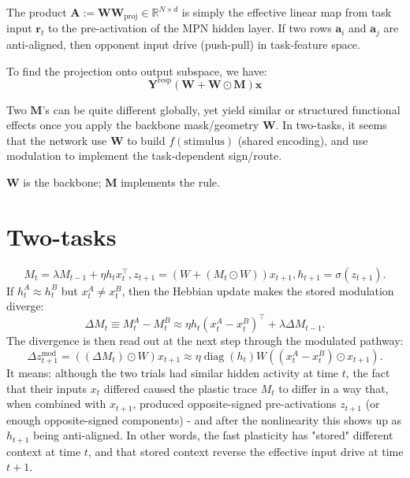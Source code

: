 \documentclass{article}
\begin{document}
The product $\mathbf{A}:=\mathbf{W}\mathbf{W}_{\text{proj}} \in \mathbb{R}^{N \times d}$ is simply the effective linear map from task input $\mathbf{r}_t$ to the pre-activation of the MPN hidden layer. If two rows $\mathbf{a}_i$ and $\mathbf{a}_j$ are anti-aligned, then opponent input drive (push-pull) in task-feature space.

To find the projection onto output subspace, we have:
\begin{equation}
    \mathbf{Y}^{\text{resp}} \left(\mathbf{W} + \mathbf{W} \odot \mathbf{M} \right) \mathbf{x}
\end{equation}

Two $\mathbf{M}$'s can be quite different globally, yet yield similar or structured functional effects once you apply the backbone mask/geometry $\mathbf{W}$. In two-tasks, it seems that the network use $\mathbf{W}$ to build $f(\text{stimulus})$ (shared encoding), and use modulation to implement the task-dependent sign/route.

$\mathbf{W}$ is the backbone; $\mathbf{M}$ implements the rule.

\section{Two-tasks}
\begin{equation}
    M_t = \lambda M_{t-1} + \eta h_t x_t^{\top}, z_{t+1}=(W+(M_t \odot W))x_{t+1}, h_{t+1}=\sigma(z_{t+1}).
\end{equation}
If $h_t^A \approx h_t^B$ but $x_t^{A} \neq x_t^B$, then the Hebbian update makes the stored modulation diverge:
\begin{equation}
    \Delta M_t \equiv M_t^A - M_t^B \approx \eta h_t(x_t^A - x_t^B)^{\top} + \lambda \Delta M_{t-1}.
\end{equation}
The divergence is then read out at the next step through the modulated pathway:
\begin{equation}
    \Delta z_{t+1}^{\text{mod}} = ((\Delta M_t) \odot W)x_{t+1} \approx \eta \operatorname{diag}(h_t) W((x_t^A-x_t^B) \odot x_{t+1}).
\end{equation}
It means: although the two trials had similar hidden activity at time $t$, the fact that their inputs $x_t$ differed caused the plastic trace $M_t$ to differ in a way that, when combined with $x_{t+1}$, produced opposite-signed pre-activations $z_{t+1}$ (or enough opposite-signed components) - and after the nonlinearity this shows up as $h_{t+1}$ being anti-aligned. In other words, the fast plasticity has "stored" different context at time $t$, and that stored context reverse the effective input drive at time $t+1$.
\end{document}
